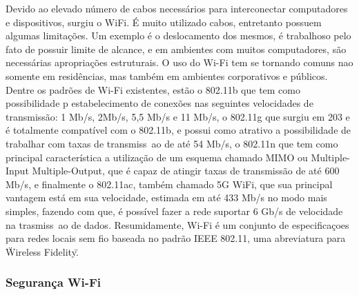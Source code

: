 \documentclass[journal]{IEEEtran}
\begin{document}
Devido ao elevado número de cabos necessários para interconectar computadores e dispositivos, surgiu o WiFi. É muito utilizado cabos, entretanto possuem algumas limitações. Um exemplo é o deslocamento dos mesmos, é trabalhoso pelo fato de possuir limite de alcance, e em ambientes com muitos computadores, são necessárias apropriações estruturais. O uso do Wi-Fi tem se tornando comuns nao somente em residências, mas também em ambientes corporativos e públicos. Dentre os padrões de Wi-Fi existentes, estão o 802.11b que tem como possibilidade p estabelecimento de conexões nas seguintes velocidades de transmissão: 1 Mb/s, 2Mb/s, 5,5 Mb/s e 11 Mb/s, o 802.11g que surgiu em 203 e é totalmente compatível com o 802.11b, e possui como atrativo a possibilidade de trabalhar com taxas de transmiss~ao de até 54 Mb/s, o 802.11n que tem como principal característica a utilização de um esquema chamado MIMO ou Multiple-Input Multiple-Output, que é capaz de atingir taxas de transmissão de até 600 Mb/s, e finalmente o 802.11ac, também chamado 5G WiFi, que sua principal vantagem está em sua velocidade, estimada em até 433 Mb/s no modo mais simples, fazendo com que, é possível fazer a rede suportar 6 Gb/s  de velocidade na trasmiss~ao de dados. Resumidamente, Wi-Fi é um conjunto de especificaçoes para redes locais sem fio baseada no padrão IEEE 802.11, uma abreviatura para \"Wireless Fidelity\". \cite{wifiinfowester}

\subsubsection{Segurança Wi-Fi}
\end{document}
